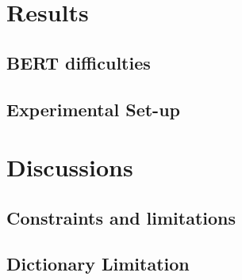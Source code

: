 \chapter{Results}
\section{BERT difficulties}
\section{Experimental Set-up}

\chapter{Discussions}
\section{Constraints and limitations}
\section{Dictionary Limitation}